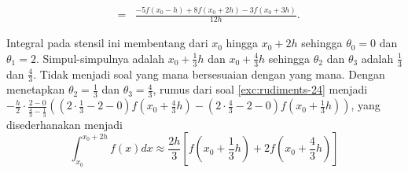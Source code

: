 \begin{description}
\begin{eqnarray*}
 & = & \frac{-5f(x_{0}-h)+8f(x_{0}+2h)-3f(x_{0}+3h)}{12h}.
\end{eqnarray*}
\item [{\ref{exc:rudiments-26}:}] Integral pada stensil ini membentang
dari $x_{0}$ hingga $x_{0}+2h$ sehingga $\theta_{0}=0$ dan $\theta_{1}=2$.
Simpul-simpulnya adalah $x_{0}+\frac{1}{3}h$ dan $x_{0}+\frac{4}{3}h$
sehingga $\theta_{2}$ dan $\theta_{3}$ adalah $\frac{1}{3}$ dan
$\frac{4}{3}$. Tidak menjadi soal yang mana bersesuaian dengan yang
mana. Dengan menetapkan $\theta_{2}=\frac{1}{3}$ dan $\theta_{3}=\frac{4}{3}$,
rumus dari soal \ref{exc:rudiments-24} menjadi $-\frac{h}{2}\cdot\frac{2-0}{\frac{4}{3}-\frac{1}{3}}\left((2\cdot\frac{1}{3}-2-0)f(x_{0}+\frac{4}{3}h)-(2\cdot\frac{4}{3}-2-0)f(x_{0}+\frac{1}{3}h)\right)$,
yang disederhanakan menjadi
\[
\int_{x_{0}}^{x_{0}+2h}f(x)dx\approx\frac{2h}{3}\left[f\left(x_{0}+\frac{1}{3}h\right)+2f\left(x_{0}+\frac{4}{3}h\right)\right]
\]
\end{description}

